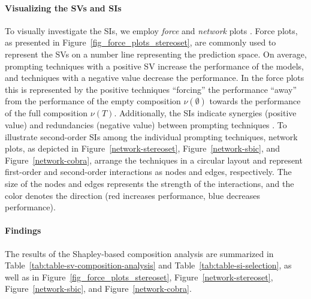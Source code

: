 \paragraph{Visualizing the SVs and SIs}
To visually investigate the SIs, we employ \emph{force} \cite{Lundberg.2017} and \emph{network} plots \cite{muschalik2024}.
Force plots, as presented in Figure~\ref{fig_force_plots_stereoset}, are commonly used to represent the SVs on a number line representing the prediction space.
On average, prompting techniques with a positive SV increase the performance of the models, and techniques with a negative value decrease the performance.
In the force plots this is represented by the positive techniques ``forcing'' the performance ``away'' from the performance of the empty composition $\nu(\emptyset)$ towards the performance of the full composition $\nu(T)$.
Additionally, the SIs indicate synergies (positive value) and redundancies (negative value) between prompting techniques \citep{fumagalli2024a}.
To illustrate second-order SIs among the individual prompting techniques, network plots, as depicted in Figure~\ref{network-stereoset}, Figure~\ref{network-sbic}, and Figure~\ref{network-cobra}, arrange the techniques in a circular layout and represent first-order and second-order interactions as nodes and edges, respectively.
The size of the nodes and edges represents the strength of the interactions, and the color denotes the direction (red increases performance, blue decreases performance).

\paragraph{Findings}
The results of the Shapley-based composition analysis are summarized in Table~\ref{tab:table-sv-composition-analysis} and Table~\ref{tab:table-si-selection}, as well as in Figure~\ref{fig_force_plots_stereoset}, Figure~\ref{network-stereoset}, Figure~\ref{network-sbic}, and Figure~\ref{network-cobra}.

